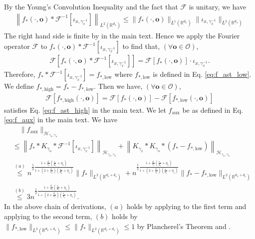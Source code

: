 \documentclass[11pt]{article}
\newcommand{\bo}{\mathbf o}
\newcommand{\calF}{\mathcal{F}}
\newcommand{\calH}{\mathcal{H}}
\newcommand{\calO}{\mathcal{O}}
\newcommand{\R}{\mathbb{R}}
\newcommand{\0}{\mathbf{0}}
\begin{document}
\begin{appendix}
By the Young's Convolution Inequality and the fact that $\calF$ is unitary, we have
\begin{align*}
    \left\|f_{\ast}(\cdot, \bo)\ast \calF^{-1}[\iota_{x,\gamma_x^{-1}}]\right\|_{L^2(\mathbb{R}^{d_x})} \leq \|f_{\ast}(\cdot, \bo)\|_{L^1(\mathbb{R}^{d_x})} \|\iota_{x,\gamma_x^{-1}}\|_{L^2(\mathbb{R}^{d_x})}
\end{align*}
The right hand side is finite by  in the main text. Hence we apply the Fourier operator $\calF$ to $f_{\ast}(\cdot, \bo)\ast \calF^{-1}[\iota_{x,\gamma_x^{-1}}]$ to find that, $(\forall \bo\in \calO)$,
\begin{align*}
    \calF[f_{\ast}(\cdot, \bo)\ast \calF^{-1}[\iota_{x,\gamma_x^{-1}}]] = \calF[f_{\ast}(\cdot,\bo)]\cdot \iota_{x,\gamma_x^{-1}}.
\end{align*}
Therefore, $f_{\ast}\ast \calF^{-1}[\iota_{x,\gamma_x^{-1}}] = f_{\ast, \mathrm{low}}$ where $f_{\ast, \mathrm{low}}$ is defined in Eq. \eqref{eq:f_ast_low}. We define $f_{\ast, \mathrm{high}} = f_{\ast} - f_{\ast, \mathrm{low}}$. Then we have, $(\forall \bo\in \calO)$, 
\begin{align*}
    \calF[f_{\ast, \mathrm{high}}(\cdot, \bo)] = \calF[f_{\ast}(\cdot, \bo)] - \calF[f_{\ast, \mathrm{low}}(\cdot, \bo)]
\end{align*}
satisfies Eq. \eqref{eq:f_ast_high} in the main text. We let $f_{\mathrm{aux}}$ be as defined in Eq. \eqref{eq:f_aux} in the main text. We have
\begin{align}\label{eq:f_aux_norm}
    &\quad \|f_{\mathrm{aux}}\|_{\calH_{\gamma_x,\gamma_o}} 
    \\ &\leq \left\| f_{\ast} \ast K_{\gamma_o} \ast \calF^{-1}[\iota_{x, \gamma_x^{-1}}] \right\|_{\calH_{\gamma_x,\gamma_o}} + \left\| K_{\gamma_x} \ast K_{\gamma_o} \ast (f_{\ast} - f_{\ast, \mathrm{low}}) \right\|_{\calH_{\gamma_x,\gamma_o}} \nonumber \\
    &\stackrel{(a)}{\leq} n^{\frac{1}{2} \frac{1+\frac{d_o}{s_o}(\frac{s_x}{d_x}+\eta_1)}{1+(2+\frac{d_o}{s_o})(\frac{s_x}{d_x}+\eta_1)}} \|f_\ast\|_{L^2(\R^{d_x+d_o})} + n^{\frac{1}{2} \frac{1+\frac{d_o}{s_o}(\frac{s_x}{d_x}+\eta_1)}{1+(2+\frac{d_o}{s_o})(\frac{s_x}{d_x}+\eta_1)}}
    \|f_{\ast} - f_{\ast,\mathrm{low}} \|_{L^2(\R^{d_x+d_o})}  \nonumber \\
    &\stackrel{(b)}{\leq}  3 n^{\frac{1}{2} \frac{1+\frac{d_o}{s_o}(\frac{s_x}{d_x}+\eta_1)}{1+(2+\frac{d_o}{s_o})(\frac{s_x}{d_x}+\eta_1)}}.
\end{align}
In the above chain of derivations, $(a)$ holds by applying  to the first term and applying  to the second term, $(b)$ holds by $\|f_{\ast, \mathrm{low}}\|_{L^2(\mathbb{R}^{d_x+d_o})}\leq \|f_{\ast}\|_{L^2(\mathbb{R}^{d_x+d_o})} \leq 1$ by Plancherel's Theorem and .

\end{appendix}
\end{document}

